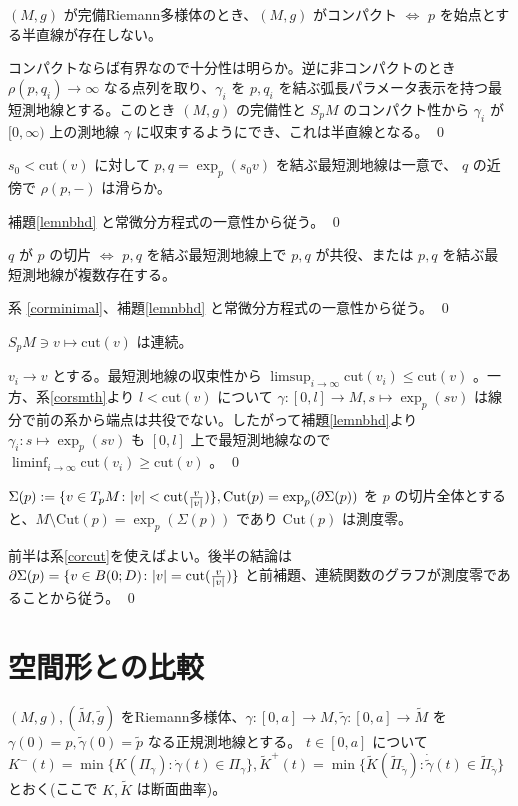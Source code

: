 \documentclass[dvipdfmx,a4paper]{jsreport}
\theoremstyle{definition}
\newcommand{\der}{\partial}
\renewcommand{\tilde}{\widetilde}
\begin{document}
\lem $(M,g)$ が完備Riemann多様体のとき、$(M,g)$ がコンパクト $\iff$ $p$ を始点とする半直線が存在しない。

\prf コンパクトならば有界なので十分性は明らか。逆に非コンパクトのとき $\rho(p,q_i) \to \infty$ なる点列を取り、$\gamma_i$ を $p,q_i$ を結ぶ弧長パラメータ表示を持つ最短測地線とする。このとき $(M,g)$ の完備性と $S_pM$ のコンパクト性から $\gamma_i$ が $[0,\infty)$ 上の測地線 $\gamma$ に収束するようにでき、これは半直線となる。 \qed

\cor\label{corsmth} $s_0<\mbox{cut}(v)$ に対して $p,q=\exp_p(s_0v)$ を結ぶ最短測地線は一意で、 $q$ の近傍で $\rho(p,-)$ は滑らか。

\prf 補題\ref{lemnbhd} と常微分方程式の一意性から従う。 \qed

\cor\label{corcut} $q$ が $p$ の切片 $\iff$ $p,q$ を結ぶ最短測地線上で $p,q$ が共役、または $p,q$ を結ぶ最短測地線が複数存在する。

\prf 系 \ref{corminimal}、補題\ref{lemnbhd} と常微分方程式の一意性から従う。 \qed

\lem $S_pM \ni v \mapsto \mbox{cut}(v)$ は連続。

\prf $v_i \to v$ とする。最短測地線の収束性から $\limsup_{i \to \infty} \mbox{cut}(v_i) \leq \mbox{cut}(v)$ 。一方、系\ref{corsmth}より $l<\mbox{cut}(v)$ について $\gamma:[0,l] \to M,s \mapsto \exp_p(sv)$ は線分で前の系から端点は共役でない。したがって補題\ref{lemnbhd}より $\gamma_i:s \mapsto \exp_p(sv)$ も $[0,l]$ 上で最短測地線なので $\liminf_{i \to \infty} \mbox{cut}(v_i) \geq \mbox{cut}(v)$ 。 \qed

\cor\label{corzero} $\Sigma(p):=\{v \in T_pM \colon |v|<\mbox{cut}({v \over |v|})\},\mbox{Cut}(p)=\exp_p(\der \Sigma(p))$ を $p$ の切片全体とすると、$M \setminus \mbox{Cut}(p)=\exp_p(\Sigma(p))$ であり $\mbox{Cut}(p)$ は測度零。

\prf 前半は系\ref{corcut}を使えばよい。後半の結論は $\der \Sigma(p)=\{v \in B(0;D) \colon |v|=\mbox{cut}({v \over |v|})\}$ と前補題、連続関数のグラフが測度零であることから従う。 \qed

\section{空間形との比較}

$(M,g),(\tilde{M},\tilde{g})$ をRiemann多様体、$\gamma:[0,a] \to M,\tilde{\gamma}:[0,a] \to \tilde{M}$ を $\gamma(0)=p,\tilde{\gamma}(0)=\tilde{p}$ なる正規測地線とする。 $t \in [0,a]$ について $K^-(t)=\min\{K(\Pi_{\gamma}) \colon \dot{\gamma}(t) \in \Pi_{\gamma}\},\tilde{K}^+(t)=\min\{\tilde{K}(\tilde{\Pi}_{\tilde{\gamma}}) \colon \dot{\tilde{\gamma}}(t) \in \tilde{\Pi}_{\tilde{\gamma}}\}$ とおく(ここで $K,\tilde{K}$ は断面曲率)。
\end{document}

